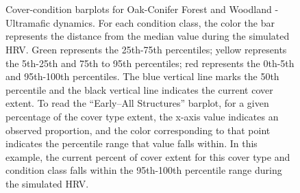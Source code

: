 \begin{figure}[!htbp]
  \\%
  \\%
    \\%
    \\%
    \\%
    \\%
    \\%
  \caption{Cover-condition barplots for Oak-Conifer Forest and Woodland - Ultramafic dynamics. For each condition class, the color the bar represents the distance from the median value during the simulated HRV. Green represents the 25th-75th percentiles; yellow represents the 5th-25th and 75th to 95th percentiles; red represents the 0th-5th and 95th-100th percentiles. The blue vertical line marks the 50th percentile and the black vertical line indicates the current cover extent. To read the ``Early–All Structures'' barplot, for a given percentage of the cover type extent, the x-axis value indicates an observed proportion, and the color corresponding to that point indicates the percentile range that value falls within. In this example, the current percent of cover extent for this cover type and condition class falls within the 95th-100th percentile range during the simulated HRV.}
  \label{fig:covcondbar_ocfwu}
\end{figure}

